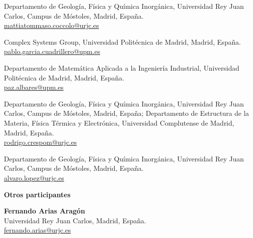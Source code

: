 \documentclass[11pt,a4paper]{article}
\begin{document}
\begin{description}[style=multiline,leftmargin=4.3cm,font=\normalfont\bfseries]
\item[Mattia Coccolo]
Departamento de Geología, Física y Química Inorgánica,
Universidad Rey Juan Carlos, Campus de Móstoles, Madrid, España.\\
\href{mailto:mattiatommaso.coccolo@urjc.es}
{mattiatommaso.coccolo@urjc.es}

\item[Pablo García]
Complex Systems Group, Universidad Politécnica de Madrid, Madrid, España.\\
\href{mailto:pablo.garcia.cuadrillero@upm.es}
{pablo.garcia.cuadrillero@upm.es}

\item[Paz Albares Vicente]
Departamento de Matemática Aplicada a la Ingeniería Industrial,
Universidad Politécnica de Madrid, Madrid, España.\\
\href{mailto:paz.albares@upm.es}{paz.albares@upm.es}

\item[Rodrigo Crespo Miguel]
Departamento de Geología, Física y Química Inorgánica,
Universidad Rey Juan Carlos, Campus de Móstoles, Madrid, España;
Departamento de Estructura de la Materia, Física Térmica y Electrónica,
Universidad Complutense de Madrid, Madrid, España.\\
\href{mailto:rodrigo.crespom@urjc.es}{rodrigo.crespom@urjc.es}

\item[Álvaro García López]
Departamento de Geología, Física y Química Inorgánica,
Universidad Rey Juan Carlos, Campus de Móstoles, Madrid, España.\\
\href{mailto:alvaro.lopez@urjc.es}{alvaro.lopez@urjc.es}

\end{description}

\normalsize
\newpage

\begin{center}
{\LARGE\bfseries Otros participantes}
\end{center}

\vspace{0.6cm}

\small

\noindent
\textbf{Fernando Arias Aragón}\\
Universidad Rey Juan Carlos, Madrid, España.\\
\href{mailto:fernando.arias@urjc.es}
     {fernando.arias@urjc.es}
\end{document}
